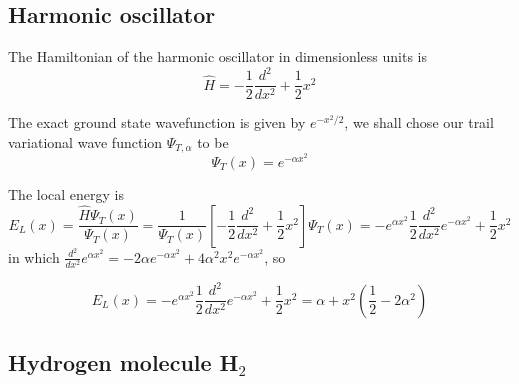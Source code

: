 \documentclass{article}
\begin{document}
\subsection{Harmonic oscillator}
The Hamiltonian of the harmonic oscillator in dimensionless units is
\begin{equation}
 \hat{H}=-\frac12 \frac{d^2}{dx^2}+\frac12 x^2
\end{equation}

The exact ground state wavefunction is given by $e^{-x^2/2}$, we shall chose our trail variational wave function $\Psi_{T,\alpha}$ to be
\begin{equation}
 \Psi_{T}(x)=e^{-\alpha x^2}
\end{equation}

The local energy is \begin{equation}
 E_L(x)=\frac{\hat{H}\Psi_T(x)}{\Psi_T(x)}=\frac{1}{\Psi_T(x)} \left[ -\frac12 \frac{d^2}{dx^2}+\frac12 x^2 \right] \Psi_T(x)= -e^{\alpha x^2}\frac12 \frac{d^2}{dx^2}e^{-\alpha x^2}+\frac12 x^2
\end{equation}
in which $\frac{d^2}{dx^2}e^{\alpha x^2}=-2\alpha e^{-\alpha x^2}+4\alpha^2x^2e^{-\alpha x^2}$, so

\begin{equation}
 E_L(x)= -e^{\alpha x^2}\frac12 \frac{d^2}{dx^2}e^{-\alpha x^2}+\frac12 x^2=\alpha+ x^2 \left(\frac12 - 2\alpha^2 \right)
\end{equation}

\subsection{Hydrogen molecule H$_2$}
\end{document}

